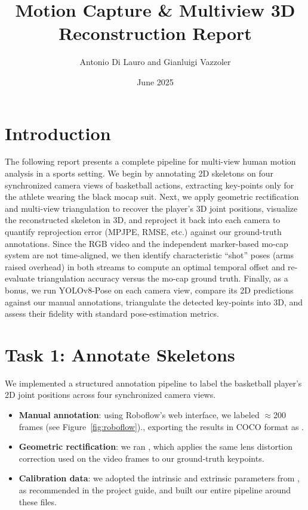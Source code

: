 \documentclass[11pt,a4paper]{article}
\title{Motion Capture \& Multiview 3D Reconstruction Report}
\author{Antonio Di Lauro and Gianluigi Vazzoler}
\date{June 2025}
\begin{document}
\maketitle

\section*{Introduction}
The following report presents a complete pipeline for multi-view human motion analysis in a sports setting. We begin by annotating 2D skeletons on four synchronized camera views of basketball actions, extracting key-points only for the athlete wearing the black mocap suit. Next, we apply geometric rectification and multi-view triangulation to recover the player’s 3D joint positions, visualize the reconstructed skeleton in 3D, and reproject it back into each camera to quantify reprojection error (MPJPE, RMSE, etc.) against our ground-truth annotations. Since the RGB video and the independent marker-based mo-cap system are not time-aligned, we then identify characteristic “shot” poses (arms raised overhead) in both streams to compute an optimal temporal offset and re-evaluate triangulation accuracy versus the mo-cap ground truth. Finally, as a bonus, we run YOLOv8-Pose on each camera view, compare its 2D predictions against our manual annotations, triangulate the detected key-points into 3D, and assess their fidelity with standard pose-estimation metrics.

\section*{Task 1: Annotate Skeletons}
We implemented a structured annotation pipeline to label the basketball player’s 2D joint positions across four synchronized camera views.  

\begin{itemize}
  \item \textbf{Manual annotation}: using Roboflow’s web interface, we labeled $\approx$200 frames (see Figure~\ref{fig:roboflow})., exporting the results in COCO format as .
  \item \textbf{Geometric rectification}: we ran , which applies the same lens distortion correction used on the video frames to our ground-truth keypoints.
  \item \textbf{Calibration data}: we adopted the intrinsic and extrinsic parameters from , as recommended in the project guide, and built our entire pipeline around these files.
\end{itemize}
\end{document}
